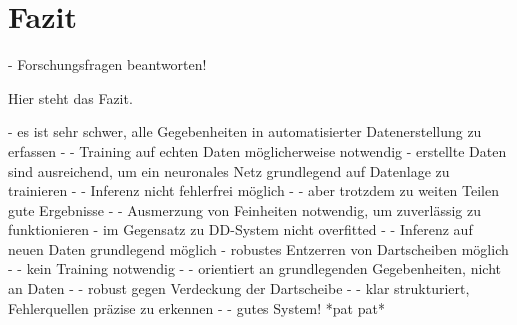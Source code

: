 
\chapter{Fazit}
\label{cha:fazit}

- Forschungsfragen beantworten!

Hier steht das Fazit.

- es ist sehr schwer, alle Gegebenheiten in automatisierter Datenerstellung zu erfassen
- - Training auf echten Daten möglicherweise notwendig
- erstellte Daten sind ausreichend, um ein neuronales Netz grundlegend auf Datenlage zu trainieren
- - Inferenz nicht fehlerfrei möglich
- - aber trotzdem zu weiten Teilen gute Ergebnisse
- - Ausmerzung von Feinheiten notwendig, um zuverlässig zu funktionieren
- im Gegensatz zu DD-System nicht overfitted
- - Inferenz auf neuen Daten grundlegend möglich
- robustes Entzerren von Dartscheiben möglich
- - kein Training notwendig
- - orientiert an grundlegenden Gegebenheiten, nicht an Daten
- - robust gegen Verdeckung der Dartscheibe
- - klar strukturiert, Fehlerquellen präzise zu erkennen
- - gutes System! *pat pat*

